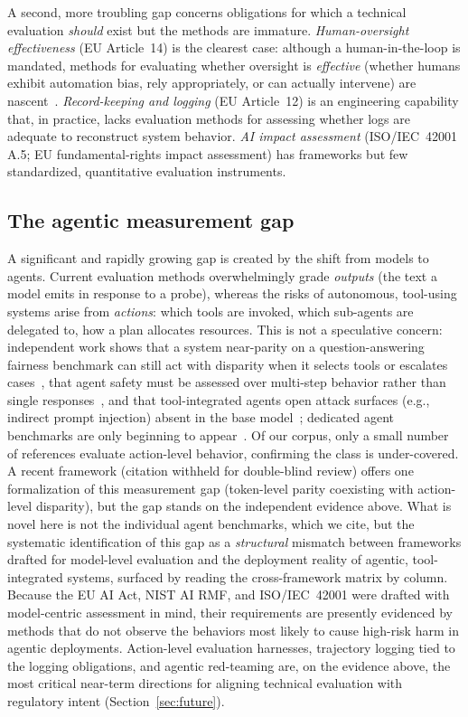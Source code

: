A second, more troubling gap concerns obligations for which a technical evaluation
\emph{should} exist but the methods are immature. \emph{Human-oversight effectiveness}
(EU Article~14) is the clearest case: although a human-in-the-loop is mandated, methods
for evaluating whether oversight is \emph{effective} (whether humans exhibit automation
bias, rely appropriately, or can actually intervene) are nascent~\cite{guo2024reliance,%
chen2024reliancedrills,romeo2025automationbias}. \emph{Record-keeping and logging} (EU
Article~12) is an engineering capability that, in practice, lacks evaluation methods for
assessing whether logs are adequate to reconstruct system behavior. \emph{AI impact
assessment} (ISO/IEC~42001 A.5; EU fundamental-rights impact assessment) has frameworks
but few standardized, quantitative evaluation instruments.

\subsection{The agentic measurement gap}
A significant and rapidly growing gap is created by the shift from models to agents.
Current evaluation methods overwhelmingly grade \emph{outputs} (the text a model emits in
response to a probe), whereas the risks of autonomous, tool-using systems arise from
\emph{actions}: which tools are invoked, which sub-agents are delegated to, how a plan
allocates resources. This is not a speculative concern: independent work shows that a
system near-parity on a question-answering fairness benchmark can still act with disparity
when it selects tools or escalates cases~\cite{li2025actions,blankenstein2025biasbusters},
that agent safety must be assessed over multi-step behavior rather than single
responses~\cite{zhang2024agent}, and that tool-integrated agents open attack surfaces (e.g.,
indirect prompt injection) absent in the base model~\cite{greshake2023notwhat}; dedicated
agent benchmarks are only beginning to appear~\cite{gu2025safesearch,peng2025eu}. Of our
corpus, only a small number of references evaluate action-level behavior, confirming the
class is under-covered. A recent framework (citation withheld for double-blind review) offers
one formalization of this measurement gap (token-level parity coexisting with action-level
disparity), but the gap stands on the independent evidence above. What is novel here is not
the individual agent benchmarks, which we cite, but the systematic identification of this
gap as a \emph{structural} mismatch between frameworks drafted for model-level evaluation
and the deployment reality of agentic, tool-integrated systems, surfaced by reading the
cross-framework matrix by column. Because the EU AI Act,
NIST AI RMF, and ISO/IEC~42001 were drafted with model-centric assessment in mind, their
requirements are presently evidenced by methods that do not observe the behaviors most
likely to cause high-risk harm in agentic deployments. Action-level evaluation harnesses,
trajectory logging tied to the logging obligations, and agentic red-teaming are, on the
evidence above, the most critical near-term directions for aligning technical evaluation
with regulatory intent (Section~\ref{sec:future}).


